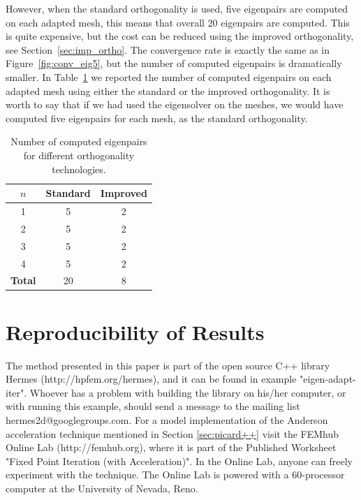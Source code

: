 \documentclass[preprint,12pt]{elsarticle}
\begin{document}

However, when the standard orthogonality is used, five eigenpairs are computed on each adapted mesh, this means that overall 20 eigenpairs are computed. This is quite expensive, but the cost can be reduced using the improved orthogonality, see Section~\ref{sec:imp_ortho}. The convergence rate is exactly the same as in Figure~\ref{fig:conv_eig5}, but the number of computed eigenpairs is dramatically smaller. In Table~\ref{tab:imp_orhto} we reported the number of computed eigenpairs on each adapted mesh using either the standard or the improved orthogonality.
It is worth to say that if we had used the eigensolver on the meshes, we would have computed five eigenpairs for each mesh, as the standard orthogonality.

\begin{table}[h]
\begin{center}

\begin{tabular}{|c|c|c|}
\hline
$n$ &  Standard &Improved\\
\hline
\hline
1 & 5 & 2\\
\hline
2 & 5 & 2\\
\hline
3 & 5 & 2\\
\hline
4 & 5 & 2\\
\hline \hline
\bf{Total} & 20 & 8\\
\hline
\end{tabular}
\end{center}

\caption{Number of computed eigenpairs for different orthogonality technologies.}\label{tab:imp_orhto}
\end{table}


\section{Reproducibility of Results} \label{sec:reproducibility}

The method presented in this paper is part of the open source C++ library 
Hermes (http://hpfem.org/hermes), and it can be found in 
example "eigen-adapt-iter". Whoever
has a problem with building the library on his/her computer, or with running 
this example, should send
a message to the mailing list hermes2d@googlegroups.com. For a model 
implementation of the Anderson acceleration technique mentioned in Section 
\ref{sec:picard++} visit the FEMhub Online Lab (http://femhub.org), where
it is part of the Published Worksheet "Fixed Point Iteration (with Acceleration)".
In the Online Lab, anyone can freely experiment with the technique. The 
Online Lab is powered with a 60-processor computer at the University of 
Nevada, Reno.
\end{document}
